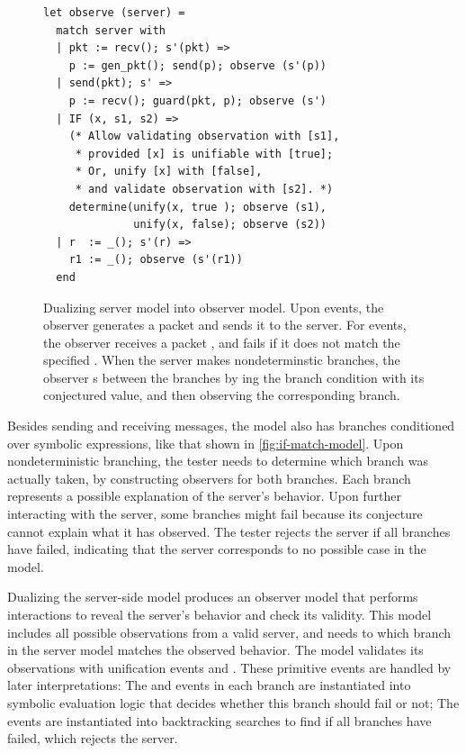 \begin{figure}
  \begin{lstlisting}[style=customcoq]
let observe (server) =
  match server with
  | pkt := recv(); s'(pkt) =>
    p := gen_pkt(); send(p); observe (s'(p))
  | send(pkt); s' =>
    p := recv(); guard(pkt, p); observe (s')
  | IF (x, s1, s2) =>
    (* Allow validating observation with [s1],
     * provided [x] is unifiable with [true];
     * Or, unify [x] with [false],
     * and validate observation with [s2]. *)
    determine(unify(x, true ); observe (s1),
              unify(x, false); observe (s2))
  | r  := _(); s'(r) =>
    r1 := _(); observe (s'(r1))
  end
  \end{lstlisting}
  \caption{Dualizing server model into observer model.  Upon  events,
    the observer generates a packet and sends it to the server.  For 
    events, the observer receives a packet , and fails if it does not
    match the specified .  When the server makes nondeterminstic
     branches, the observer s between the branches by
    ing the branch condition with its conjectured value, and then
    observing the corresponding branch.
  }
  \label{fig:sym-observe}
\end{figure}

Besides sending and receiving messages, the model also has  branches
conditioned over symbolic expressions, like that shown in
\autoref{fig:if-match-model}.  Upon nondeterministic branching, the tester needs to
determine which branch was actually taken, by constructing observers for both
branches.  Each branch represents a possible explanation of the server's
behavior.  Upon further interacting with the server, some branches might fail
because its conjecture cannot explain what it has observed.  The tester rejects
the server if all branches have failed, indicating that the server corresponds
to no possible case in the model.

Dualizing the server-side model produces an observer model that performs
interactions to reveal the server's behavior and check its validity.  This model
includes all possible observations from a valid server, and needs to
 which branch in the server model matches the observed behavior.
The model validates its observations with unification events  and
.  These primitive events are handled by later interpretations: The
 and  events in each branch are instantiated into symbolic
evaluation logic that decides whether this branch should fail or not; The
 events are instantiated into backtracking searches to find if
all branches have failed, which rejects the server.

